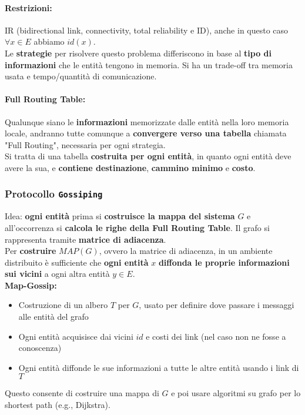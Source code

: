 \paragraph{Restrizioni:} IR (bidirectional link, connectivity, total reliability e ID), anche in questo caso $\forall x \in E$ abbiamo $id(x)$.\\

Le \textbf{strategie} per risolvere questo problema differiscono in base al \textbf{tipo di informazioni} che le entità tengono in memoria. Si ha un trade-off tra memoria usata e tempo/quantità di comunicazione.\\

\paragraph{Full Routing Table:} Qualunque siano le \textbf{informazioni} memorizzate dalle entità nella loro memoria locale, andranno tutte comunque a \textbf{convergere verso una tabella} chiamata "Full Routing", necessaria per ogni strategia.\\

Si tratta di una tabella \textbf{costruita per ogni entità}, in quanto ogni entità deve avere la sua, e \textbf{contiene destinazione}, \textbf{cammino minimo} e \textbf{costo}.

\newpage

\subsubsection{Protocollo \texttt{Gossiping}}

Idea: \textbf{ogni entità} prima si \textbf{costruisce la mappa del sistema} $G$ e all'occorrenza si \textbf{calcola le righe della Full Routing Table}. Il grafo si rappresenta tramite \textbf{matrice di adiacenza}.\\

Per \textbf{costruire} $MAP(G)$, ovvero la matrice di adiacenza, in un ambiente distribuito è sufficiente che \textbf{ogni entità} $x$ \textbf{diffonda le proprie informazioni sui vicini} a ogni altra entità $y \in E$.\\

\textbf{Map-Gossip:}
\begin{itemize}
	\item Costruzione di un albero $T$ per $G$, usato per definire dove passare i messaggi alle entità del grafo
	\item Ogni entità acquisisce dai vicini $id$ e costi dei link (nel caso non ne fosse a conoscenza)
	\item Ogni entità diffonde le sue informazioni a tutte le altre entità usando i link di $T$
\end{itemize}
Questo consente di costruire una mappa di $G$ e poi usare algoritmi su grafo per lo shortest path (e.g., Dijkstra).\\

